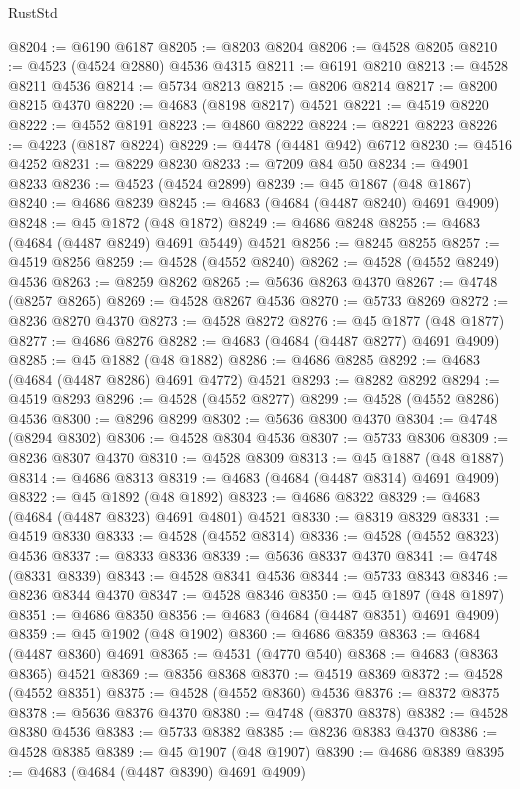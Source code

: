 \begin{lexlean}{RustStd}
\begin{coremodule}
@8204 := @6190 @6187
@8205 := @8203 @8204
@8206 := @4528 @8205
@8210 := @4523 (@4524 @2880) @4536 @4315
@8211 := @6191 @8210
@8213 := @4528 @8211 @4536
@8214 := @5734 @8213
@8215 := @8206 @8214
@8217 := @8200 @8215 @4370
@8220 := @4683 (@8198 @8217) @4521
@8221 := @4519 @8220
@8222 := @4552 @8191
@8223 := @4860 @8222
@8224 := @8221 @8223
@8226 := @4223 (@8187 @8224)
@8229 := @4478 (@4481 @942) @6712
@8230 := @4516 @4252
@8231 := @8229 @8230
@8233 := @7209 @84 @50
@8234 := @4901 @8233
@8236 := @4523 (@4524 @2899)
@8239 := @45 @1867 (@48 @1867)
@8240 := @4686 @8239
@8245 := @4683 (@4684 (@4487 @8240) @4691 @4909)
@8248 := @45 @1872 (@48 @1872)
@8249 := @4686 @8248
@8255 := @4683 (@4684 (@4487 @8249) @4691 @5449) @4521
@8256 := @8245 @8255
@8257 := @4519 @8256
@8259 := @4528 (@4552 @8240)
@8262 := @4528 (@4552 @8249) @4536
@8263 := @8259 @8262
@8265 := @5636 @8263 @4370
@8267 := @4748 (@8257 @8265)
@8269 := @4528 @8267 @4536
@8270 := @5733 @8269
@8272 := @8236 @8270 @4370
@8273 := @4528 @8272
@8276 := @45 @1877 (@48 @1877)
@8277 := @4686 @8276
@8282 := @4683 (@4684 (@4487 @8277) @4691 @4909)
@8285 := @45 @1882 (@48 @1882)
@8286 := @4686 @8285
@8292 := @4683 (@4684 (@4487 @8286) @4691 @4772) @4521
@8293 := @8282 @8292
@8294 := @4519 @8293
@8296 := @4528 (@4552 @8277)
@8299 := @4528 (@4552 @8286) @4536
@8300 := @8296 @8299
@8302 := @5636 @8300 @4370
@8304 := @4748 (@8294 @8302)
@8306 := @4528 @8304 @4536
@8307 := @5733 @8306
@8309 := @8236 @8307 @4370
@8310 := @4528 @8309
@8313 := @45 @1887 (@48 @1887)
@8314 := @4686 @8313
@8319 := @4683 (@4684 (@4487 @8314) @4691 @4909)
@8322 := @45 @1892 (@48 @1892)
@8323 := @4686 @8322
@8329 := @4683 (@4684 (@4487 @8323) @4691 @4801) @4521
@8330 := @8319 @8329
@8331 := @4519 @8330
@8333 := @4528 (@4552 @8314)
@8336 := @4528 (@4552 @8323) @4536
@8337 := @8333 @8336
@8339 := @5636 @8337 @4370
@8341 := @4748 (@8331 @8339)
@8343 := @4528 @8341 @4536
@8344 := @5733 @8343
@8346 := @8236 @8344 @4370
@8347 := @4528 @8346
@8350 := @45 @1897 (@48 @1897)
@8351 := @4686 @8350
@8356 := @4683 (@4684 (@4487 @8351) @4691 @4909)
@8359 := @45 @1902 (@48 @1902)
@8360 := @4686 @8359
@8363 := @4684 (@4487 @8360) @4691
@8365 := @4531 (@4770 @540)
@8368 := @4683 (@8363 @8365) @4521
@8369 := @8356 @8368
@8370 := @4519 @8369
@8372 := @4528 (@4552 @8351)
@8375 := @4528 (@4552 @8360) @4536
@8376 := @8372 @8375
@8378 := @5636 @8376 @4370
@8380 := @4748 (@8370 @8378)
@8382 := @4528 @8380 @4536
@8383 := @5733 @8382
@8385 := @8236 @8383 @4370
@8386 := @4528 @8385
@8389 := @45 @1907 (@48 @1907)
@8390 := @4686 @8389
@8395 := @4683 (@4684 (@4487 @8390) @4691 @4909)

\end{coremodule}
\end{lexlean}
